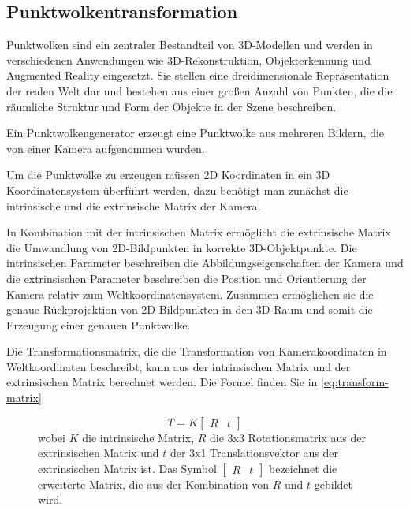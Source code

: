    \cite[vgl.][Kapitel 1.2]{SWB-1681722674} 

\subsection{Punktwolkentransformation}

Punktwolken sind ein zentraler Bestandteil von 3D-Modellen und werden in verschiedenen Anwendungen wie 3D-Rekonstruktion, Objekterkennung und Augmented Reality eingesetzt. Sie stellen eine dreidimensionale Repräsentation der realen Welt dar und bestehen aus einer großen Anzahl von Punkten, die die räumliche Struktur und Form der Objekte in der Szene beschreiben.

Ein Punktwolkengenerator erzeugt eine Punktwolke aus mehreren Bildern, die von einer Kamera aufgenommen wurden.

Um die Punktwolke zu erzeugen müssen 2D Koordinaten in ein 3D Koordinatensystem überführt werden, dazu benötigt man zunächst die intrinsische und die extrinsische Matrix der Kamera. 

In Kombination mit der intrinsischen Matrix ermöglicht die extrinsische Matrix die Umwandlung von 2D-Bildpunkten in korrekte 3D-Objektpunkte. Die intrinsischen Parameter beschreiben die Abbildungseigenschaften der Kamera und die extrinsischen Parameter beschreiben die Position und Orientierung der Kamera relativ zum Weltkoordinatensystem. Zusammen ermöglichen sie die genaue Rückprojektion von 2D-Bildpunkten in den 3D-Raum und somit die Erzeugung einer genauen Punktwolke. 

Die Transformationsmatrix, die die Transformation von Kamerakoordinaten in Weltkoordinaten beschreibt, kann aus der intrinsischen Matrix und der extrinsischen Matrix berechnet werden. Die Formel finden Sie in \ref{eq:transform-matrix}

\cite{SWB-470983582}

\begin{figure}
\begin{equation*}
T = K \begin{bmatrix}R & t\end{bmatrix}
\end{equation*}
wobei $K$ die intrinsische Matrix, $R$ die 3x3 Rotationsmatrix aus der extrinsischen Matrix und $t$ der 3x1 Translationsvektor aus der extrinsischen Matrix ist. Das Symbol $\begin{bmatrix}R & t\end{bmatrix}$ bezeichnet die erweiterte Matrix, die aus der Kombination von $R$ und $t$ gebildet wird.
\end{figure}


